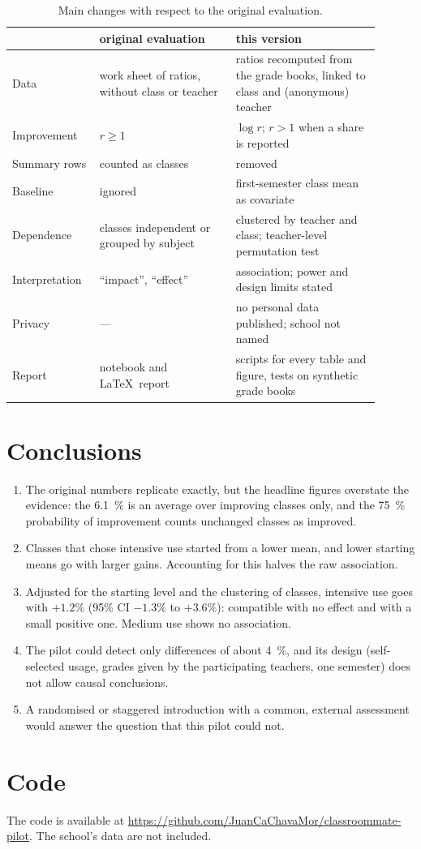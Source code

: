 \documentclass[11pt,a4paper]{article}
\begin{document}
\begin{table}[H]
  \centering\small
  \caption{Main changes with respect to the original evaluation.}
  \begin{tabular}{p{0.2\linewidth}p{0.34\linewidth}p{0.36\linewidth}}
    \toprule
    & original evaluation & this version \\
    \midrule
    Data & work sheet of ratios, without class or teacher & ratios recomputed from the grade books, linked to
      class and (anonymous) teacher \\
    Improvement & $r \ge 1$ & $\log r$; $r > 1$ when a share is reported \\
    Summary rows & counted as classes & removed \\
    Baseline & ignored & first-semester class mean as covariate \\
    Dependence & classes independent or grouped by subject & clustered by teacher and class; teacher-level
      permutation test \\
    Interpretation & ``impact'', ``effect'' & association; power and design limits stated \\
    Privacy & --- & no personal data published; school not named \\
    Report & notebook and \LaTeX\ report & scripts for every table and figure, tests on synthetic grade books \\
    \bottomrule
  \end{tabular}
\end{table}

\section{Conclusions}

\begin{enumerate}
  \item The original numbers replicate exactly, but the headline figures overstate the evidence: the
    \SI{6.1}{\percent} is an average over improving classes only, and the \SI{75}{\percent} probability of
    improvement counts unchanged classes as improved.
  \item Classes that chose intensive use started from a lower mean, and lower starting means go with larger gains.
    Accounting for this halves the raw association.
  \item Adjusted for the starting level and the clustering of classes, intensive use goes with $+1.2\%$ (95\% CI
    $-1.3\%$ to $+3.6\%$): compatible with no effect and with a small positive one. Medium use shows no association.
  \item The pilot could detect only differences of about \SI{4}{\percent}, and its design (self-selected usage,
    grades given by the participating teachers, one semester) does not allow causal conclusions.
  \item A randomised or staggered introduction with a common, external assessment would answer the question that
    this pilot could not.
\end{enumerate}

\section*{Code}
The code is available at \url{https://github.com/JuanCaChavaMor/classroommate-pilot}. The school's data are not
included.
\end{document}

